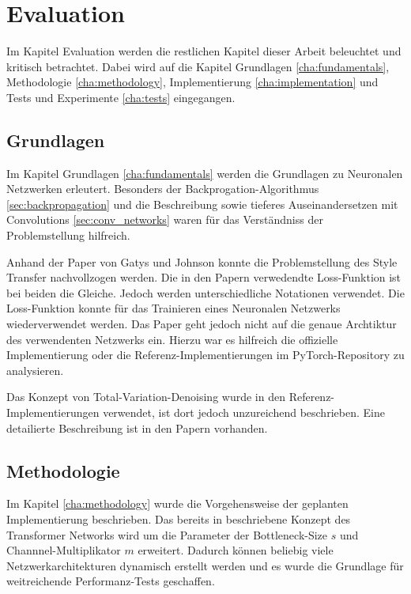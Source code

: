 \chapter{Evaluation}

Im Kapitel Evaluation werden die restlichen Kapitel dieser Arbeit beleuchtet und kritisch betrachtet. Dabei wird auf die Kapitel Grundlagen \ref{cha:fundamentals}, Methodologie \ref{cha:methodology}, Implementierung \ref{cha:implementation} und Tests und Experimente \ref{cha:tests} eingegangen.

\section{Grundlagen}

Im Kapitel Grundlagen \ref{cha:fundamentals} werden die Grundlagen zu Neuronalen Netzwerken erleutert. Besonders der Backprogation-Algorithmus \ref{sec:backpropagation} und die Beschreibung sowie tieferes Auseinandersetzen mit Convolutions \ref{sec:conv_networks} waren für das Verständniss der Problemstellung hilfreich.

Anhand der Paper von Gatys \cite{DBLP:journals/corr/GatysEB15a} und Johnson \cite{DBLP:journals/corr/JohnsonAL16} konnte die Problemstellung des Style Transfer nachvollzogen werden. Die in den Papern verwedendte Loss-Funktion ist bei beiden die Gleiche. Jedoch werden unterschiedliche Notationen verwendet. Die Loss-Funktion konnte für das Trainieren eines Neuronalen Netzwerks wiederverwendet werden. Das Paper \cite{DBLP:journals/corr/JohnsonAL16} geht jedoch nicht auf die genaue Archtiktur des verwendenten Netzwerks ein. Hierzu war es hilfreich die offizielle Implementierung \cite{Johnson2016} oder die Referenz-Implementierungen im PyTorch-Repository \cite{OnlineToturialNeuralStylePyTorch} zu analysieren.

Das Konzept von Total-Variation-Denoising wurde in den Referenz-Implementierungen verwendet, ist dort jedoch unzureichend beschrieben. Eine detailierte Beschreibung ist in den Papern \cite{RUDIN1992259, DBLP:journals/corr/EstrelaMS16} vorhanden.

\section{Methodologie}

Im Kapitel \ref{cha:methodology} wurde die Vorgehensweise der geplanten Implementierung beschrieben. Das bereits in \cite{DBLP:journals/corr/JohnsonAL16} beschriebene Konzept des Transformer Networks wird um die Parameter der Bottleneck-Size $ s $ und Channnel-Multiplikator $ m $ erweitert. Dadurch können beliebig viele Netzwerkarchitekturen dynamisch erstellt werden und es wurde die Grundlage für weitreichende Performanz-Tests geschaffen.

